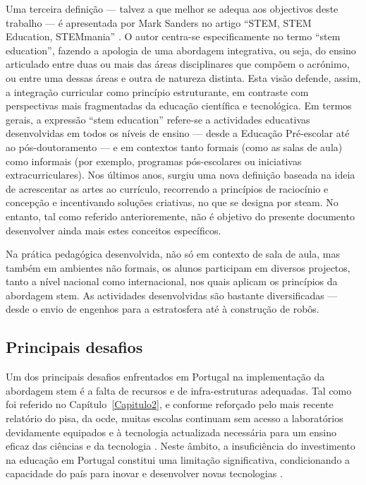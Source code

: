 Uma terceira definição — talvez a que melhor se adequa aos objectivos deste trabalho — é apresentada por Mark Sanders no artigo “STEM, STEM Education, STEMmania” \cite{TTTSTEMA77:online}. O autor centra-se especificamente no termo ``\acrshort{stem} education'', fazendo a apologia de uma abordagem integrativa, ou seja, do ensino articulado entre duas ou mais das áreas disciplinares que compõem o acrónimo, ou entre uma dessas áreas e outra de natureza distinta. Esta visão defende, assim, a integração curricular como princípio estruturante, em contraste com perspectivas mais fragmentadas da educação científica e tecnológica.
Em termos gerais, a expressão ``\acrshort{stem} education'' refere-se a actividades educativas desenvolvidas em todos os níveis de ensino — desde a Educação Pré-escolar até ao pós-doutoramento — e em contextos tanto formais (como as salas de aula) como informais (por exemplo, programas pós-escolares ou iniciativas extracurriculares). Nos últimos anos, surgiu uma nova definição baseada na ideia de acrescentar as artes ao currículo, recorrendo a princípios de raciocínio e concepção e incentivando soluções criativas, no que se designa por \acrshort{steam}. No entanto, tal como referido anterioremente, não é objetivo do presente documento desenvolver ainda mais estes conceitos específicos.

Na prática pedagógica desenvolvida, não só em contexto de sala de aula, mas também em ambientes não formais, os alunos participam em diversos projectos, tanto a nível nacional como internacional, nos quais aplicam os princípios da abordagem \acrshort{stem}. As actividades desenvolvidas são bastante diversificadas — desde o envio de engenhos para a estratosfera até à construção de robôs.

\subsection{Principais desafios}
Um dos principais desafios enfrentados em Portugal na implementação da abordagem \acrshort{stem} é a falta de recursos e de infra-estruturas adequadas. Tal como foi referido no Capítulo~\ref{Capitulo2}, e conforme reforçado pelo mais recente relatório do \acrfull{pisa}, da \acrfull{ocde}, muitas escolas continuam sem acesso a laboratórios devidamente equipados e à tecnologia actualizada necessária para um ensino eficaz das ciências e da tecnologia \cite{pisa2022volume2}. Neste âmbito, a insuficiência do investimento na educação em Portugal constitui uma limitação significativa, condicionando a capacidade do país para inovar e desenvolver novas tecnologias \cite{Oquefalt37:online, Faltadei99:online, Odesinve56:online, EDUSTATP20:online, Portugal69:online}.

